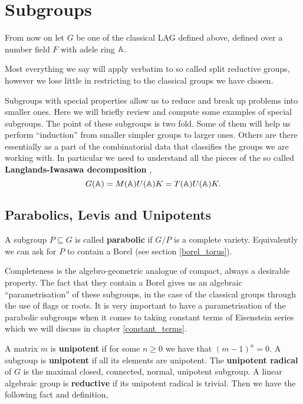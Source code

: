 \section{Subgroups}
From now on let \(G\) be one of the classical LAG defined above, defined over a number field \(F\) with adele ring \(\A\).
\begin{remark}
	Most everything we say will apply verbatim to so called split reductive groups, however we lose little in restricting to the classical groups we have chosen.
\end{remark}

Subgroups with special properties allow us to reduce and break up problems into smaller ones. Here we will briefly review and compute some examples of special subgroups. The point of these subgroups is two fold. Some of them will help us perform ``induction'' from smaller simpler groups to larger ones. Others are there essentially as a part of the combinatorial data that classifies the groups we are working with. In particular we need to understand all the pieces of the so called \textbf{Langlands-Iwasawa decomposition} \cite[2.7]{getzIntroductionAutomorphicRepresentations2024},
\begin{equation}\label{eq:iwasawa_decomposition}
    G(\A) = M(\A)U(\A) K = T(\A)U(\A)K.
\end{equation}

\subsection{Parabolics, Levis and Unipotents}
A subgroup \(P\subseteq G\) is called \textbf{parabolic} if \(G/P\) is a complete variety. Equivalently we can ask for \(P\) to contain a Borel (see section \ref{borel_torus}).

Completeness is the algebro-geometric analogue of compact, always a desirable property. The fact that they contain a Borel gives us an algebraic ``parametrisation'' of these subgroups, in the case of the classical groups through the use of flags or roots. It is very important to have a parametrisation of the parabolic subgroups when it comes to taking constant terms of Eisenstein series which we will discuss in  chapter \ref{constant_terms}.

\label{unipotent_radical_definition}
A matrix \(m\) is \textbf{unipotent} if for some \(n\geq 0\) we have that \((m-1)^n = 0\). A subgroup is \textbf{unipotent} if all its elements are unipotent. The \textbf{unipotent radical} of \(G\) is the maximal closed, connected, normal, unipotent subgroup. A linear algebraic group is \textbf{reductive} if its unipotent radical is trivial. Then we have the following fact and definition,

